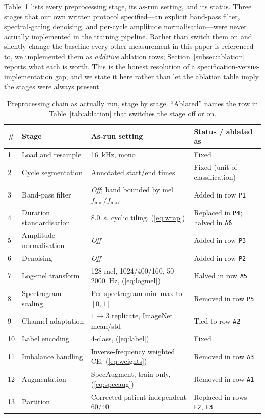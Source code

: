 \documentclass[journal,onecolumn]{IEEEtran}
\begin{document}
Table~\ref{tab:preproc} lists every preprocessing stage, its as-run setting, and
its status. Three stages that our own written protocol specified---an explicit
band-pass filter, spectral-gating denoising, and per-cycle amplitude
normalisation---were never actually implemented in the training pipeline. Rather
than switch them on and silently change the baseline every other measurement in
this paper is referenced to, we implemented them as \emph{additive} ablation rows;
Section~\ref{subsec:ablation} reports what each is worth. This is the honest
resolution of a specification-versus-implementation gap, and we state it here
rather than let the ablation table imply the stages were always present.

\begin{table}[!t]
\centering
\caption{Preprocessing chain as actually run, stage by stage. ``Ablated'' names
the row in Table~\ref{tab:ablation} that switches the stage off or on.}
\label{tab:preproc}
\small
\begin{tabular}{llll}
\toprule
\# & Stage & As-run setting & Status / ablated as \\
\midrule
1 & Load and resample        & 16~kHz, mono                                   & Fixed \\
2 & Cycle segmentation       & Annotated start/end times                      & Fixed (unit of classification) \\
3 & Band-pass filter         & \emph{Off}; band bounded by mel $f_{\min}/f_{\max}$ & Added in row \texttt{P1} \\
4 & Duration standardisation & 8.0~s, cyclic tiling, (\ref{eq:wrap})          & Replaced in \texttt{P4}; halved in \texttt{A6} \\
5 & Amplitude normalisation  & \emph{Off}                                     & Added in row \texttt{P3} \\
6 & Denoising                & \emph{Off}                                     & Added in row \texttt{P2} \\
7 & Log-mel transform        & 128 mel, 1024/400/160, 50--2000~Hz, (\ref{eq:logmel}) & Halved in row \texttt{A5} \\
8 & Spectrogram scaling      & Per-spectrogram min--max to $[0,1]$            & Removed in row \texttt{P5} \\
9 & Channel adaptation       & $1\!\rightarrow\!3$ replicate, ImageNet mean/std & Tied to row \texttt{A2} \\
10 & Label encoding          & 4-class, (\ref{eq:label})                      & Fixed \\
11 & Imbalance handling      & Inverse-frequency weighted CE, (\ref{eq:weights}) & Removed in row \texttt{A3} \\
12 & Augmentation            & SpecAugment, train only, (\ref{eq:specaug})    & Removed in row \texttt{A1} \\
13 & Partition               & Corrected patient-independent 60/40            & Replaced in rows \texttt{E2}, \texttt{E3} \\
\bottomrule
\end{tabular}
\end{table}
\end{document}
